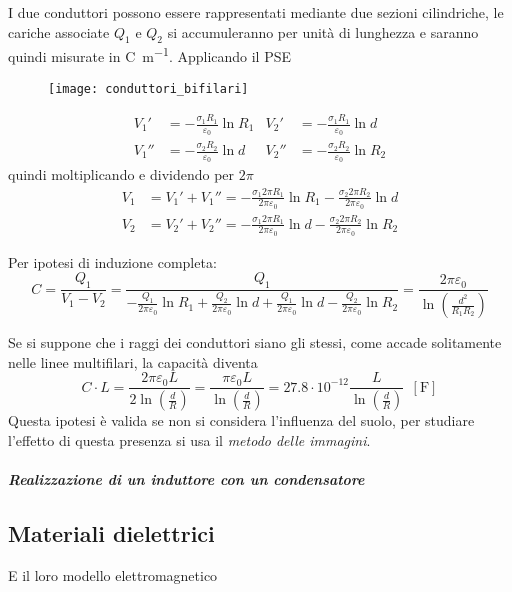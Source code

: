 I due conduttori possono essere rappresentati mediante due sezioni cilindriche,
le cariche associate $Q_1$ e $Q_2$ si accumuleranno per unità di lunghezza e 
saranno quindi misurate in \si{\coulomb\per\meter}.
Applicando il PSE
\begin{figure}[h!]
\centering
 \texttt{[image: conduttori\_bifilari]}
\caption{}
\end{figure} 

\begin{align*}
V_1' &= -\frac{\sigma_1 R_1}{\varepsilon_0} \ln R_1 & V_2' &= -\frac{\sigma_1 R_1}{\varepsilon_0} \ln d\\
V_1'' &= -\frac{\sigma_2 R_2}{\varepsilon_0} \ln d & V_2'' &= -\frac{\sigma_2 R_2}{\varepsilon_0} \ln R_2
\end{align*}
quindi moltiplicando e dividendo per $2\pi$
\begin{align*}
V_1 &= V_1' + V_1'' = -\frac{\sigma_1 2\pi R_1}{2\pi\varepsilon_0} \ln R_1 -\frac{\sigma_2 2\pi R_2}{2\pi\varepsilon_0} \ln d\\
V_2 &= V_2' + V_2'' = -\frac{\sigma_1 2\pi R_1}{2\pi\varepsilon_0} \ln d  -\frac{\sigma_2 2\pi R_2}{2\pi\varepsilon_0} \ln R_2
\end{align*}

Per ipotesi di induzione completa:
$$
C = \frac{Q_1}{V_1-V_2} = \frac{Q_1}{-\frac{Q_1}{2\pi\varepsilon_0}\ln R_1 + \frac{Q_2}{2\pi\varepsilon_0}\ln d + \frac{Q_1}{2\pi\varepsilon_0}\ln d - \frac{Q_2}{2 \pi \varepsilon_0} \ln R_2} = \frac{2\pi\varepsilon_0}{\ln \left(\frac{d^2}{R_1R_2}\right)}
$$

Se si suppone che i raggi dei conduttori siano gli stessi, come accade solitamente nelle linee multifilari, la capacità diventa
$$
C\cdot L = \frac{2\pi\varepsilon_0 L}{2 \ln \left(\frac{d}{R}\right)} = \frac{\pi \varepsilon_0 L}{\ln \left(\frac{d}{R}\right)} = 27.8\cdot 10^{-12} \frac{L}{\ln\left(\frac{d}{R}\right)}\ \ [\si{\farad}]
$$
Questa ipotesi è valida se non si considera l'influenza del suolo, per studiare l'effetto di questa 
presenza si usa il \textit{metodo delle immagini}.

\subparagraph{Realizzazione di un induttore con un condensatore}



\subsection{Materiali dielettrici}
E il loro modello elettromagnetico
